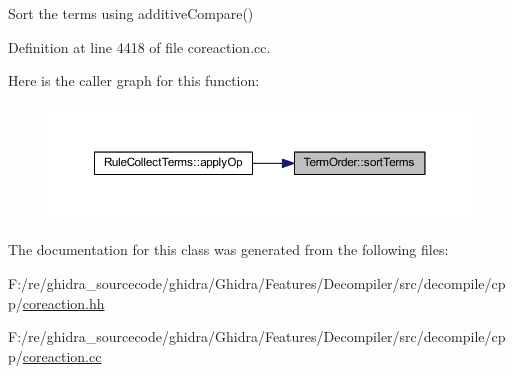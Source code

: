 Sort the terms using additive\+Compare() 



Definition at line 4418 of file coreaction.\+cc.

Here is the caller graph for this function\+:
\nopagebreak
\begin{figure}[H]
\begin{center}
\leavevmode
\includegraphics[width=350pt]{class_term_order_aa90a1457bc5dd8acd997cf59ff966893_icgraph}
\end{center}
\end{figure}


The documentation for this class was generated from the following files\+:\begin{DoxyCompactItemize}
\item 
F\+:/re/ghidra\+\_\+sourcecode/ghidra/\+Ghidra/\+Features/\+Decompiler/src/decompile/cpp/\mbox{\hyperlink{coreaction_8hh}{coreaction.\+hh}}\item 
F\+:/re/ghidra\+\_\+sourcecode/ghidra/\+Ghidra/\+Features/\+Decompiler/src/decompile/cpp/\mbox{\hyperlink{coreaction_8cc}{coreaction.\+cc}}\end{DoxyCompactItemize}
